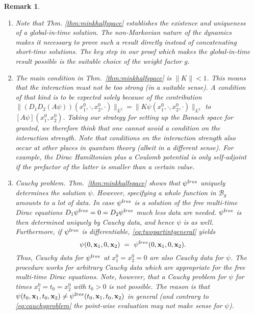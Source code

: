 \documentclass[b5paper,draft,openbib,12pt]{memoir}
\newtheorem{Remark}[Def]{Remark}
\newcommand{\vx}{\mathbf{x}}
\newcommand{\free}{{\textup free}}
\newcommand{\Banach}{\mathscr{B}}
\begin{document}
\begin{Remark}
\begin{enumerate}
%
	\item Note that Thm. \ref{thm:minkhalfspace} establishes the existence and uniqueness of a global-in-time solution. The non-Markovian nature of the dynamics makes it necessary to prove such a result directly instead of concatenating short-time solutions. The key step in our proof which makes the global-in-time result possible is the suitable choice of the weight factor $g$.
%
	\item The main condition in Thm.\ \ref{thm:minkhalfspace} is $\| K \| < 1$. This means that the interaction must not be too strong (in a suitable sense). A condition of that kind is to be expected solely because of the contribution $\| (D_1 D_2 (A \psi))(x_1^0,\cdot, x_2^0,\cdot)\|_{L^2} = \| K \psi(x_1^0,\cdot,x_2^0,\cdot)\|_{L^2}$ to $[A \psi](x_1^0,x_2^0)$. Taking our
strategy for setting up the Banach space for granted, we therefore think that one cannot avoid a condition on the interaction strength. Note that conditions on the interaction strength also occur at other places in quantum theory (albeit in a different sense). For example, the Dirac Hamiltonian plus a Coulomb potential is only self-adjoint if the prefactor of the latter is smaller than a certain value.
%
	\item \textit{Cauchy problem.} Thm.\ \ref{thm:minkhalfspace} shows that $\psi^\free$ uniquely determines the solution $\psi$. However, specifying a whole function in $\Banach_g$ amounts to a lot of data. In case $\psi^\free$ is a solution of the free multi-time Dirac equations $D_1 \psi^\free = 0 = D_2 \psi^\free$ much less data are needed. $\psi^\free$ is then determined uniquely by Cauchy data, and hence $\psi$ is as well. 
Furthermore, if $\psi^\free$ is differentiable, \eqref{eq:twopartintgeneral} yields
\begin{equation}
		\psi(0,\vx_1,0,\vx_2) ~=~ \psi^\free(0,\vx_1,0,\vx_2).
	\label{eq:cauchyproblem}
	\end{equation}
	Thus, Cauchy data for $\psi^\free$ at $x_1^0 = x_2^0 = 0$ are also Cauchy data for $\psi$. The procedure works for arbitrary Cauchy data which are appropriate for the free multi-time Dirac equations.  Note, however, that a Cauchy problem for $\psi$ for times $x_1^0 = t_0 = x_2^0$ with $t_0 > 0$ is not possible. The reason is that $\psi(t_0,\vx_1,t_0,\vx_2) \neq \psi^\free(t_0,\vx_1,t_0,\vx_2)$ in general (and contrary to \eqref{eq:cauchyproblem} the point-wise evaluation may not make sense for $\psi$).
\end{enumerate}

\end{Remark}
\end{document}
